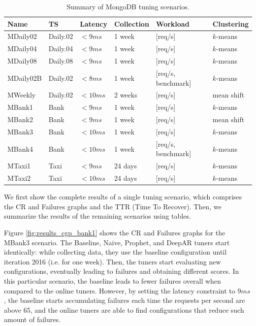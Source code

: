 \documentclass[a4paper, 12pt]{article} %
\newcommand{\ra}[1]{\renewcommand{\arraystretch}{#1}}
\begin{document}
	\begin{table}\centering 
		\ra{1.3}
		\begin{tabularx}{\textwidth}{@{}llllXX@{}}
			\midrule
			Name & TS & Latency & Collection & Workload & Clustering\\
			\midrule
			MDaily02&Daily.02 & $<9ms$  & 1 week & [req/s]  & $k$-means\\
			MDaily04&Daily.04 & $<9ms$  & 1 week & [req/s]  & $k$-means\\
			MDaily08&Daily.08 & $<9ms$  & 1 week & [req/s] & $k$-means\\
			MDaily02B&Daily.02 & $<8ms$  & 1 week & [req/s, benchmark] & $k$-means\\
			MWeekly&Daily.02 & $<10ms$  & 2 weeks & [req/s]  & mean shift\\
			MBank1&Bank & $<9ms$  & 1 week & [req/s]  & $k$-means\\
			MBank2&Bank & $<9ms$  & 1 week & [req/s]  & mean shift\\
			MBank3&Bank & $<10ms$  & 1 week & [req/s]  & $k$-means\\
			MBank4&Bank & $<10ms$  & 1 week & [req/s, benchmark]  & $k$-means\\
			MTaxi1 &Taxi & $<9ms$  & 24 days & [req/s]  & $k$-means\\
			MTaxi2 &Taxi & $<10ms$  & 24 days & [req/s]  & $k$-means\\
			
			\bottomrule
		\end{tabularx}
	\caption{Summary of MongoDB tuning scenarios. }  \label{table:results_tuning_scenarios}
	\end{table}
	
	We first show the complete results of a single tuning scenario, which comprises the CR and Failures graphs and the TTR (Time To Recover). Then, we summarize the results of the remaining scenarios using tables.
	
	Figure \ref{fig:results_cgp_bank1} shows the CR and Failures graphs for the MBank3 scenario. The Baseline, Naive, Prophet, and DeepAR tuners start identically: while collecting data, they use the baseline configuration until iteration 2016 (i.e. for one week). Then, the tuners start evaluating new configurations, eventually leading to failures and obtaining different scores. In this particular scenario, the baseline leads to fewer failures overall when compared to the online tuners. However, by setting the latency constraint to $9ms$, the baseline starts accumulating failures each time the requests per second are above 65, and the online tuners are able to find configurations that reduce such amount of failures. 
	 
\end{document}
